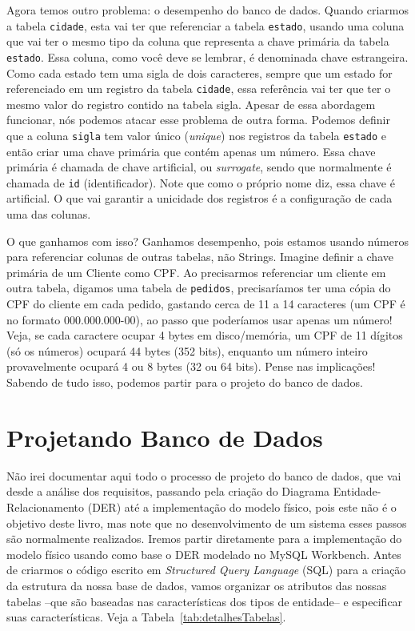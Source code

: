 Agora temos outro problema: o desempenho do banco de dados. Quando criarmos a tabela \texttt{cidade}, esta vai ter que referenciar a tabela \texttt{estado}, usando uma coluna que vai ter o mesmo tipo da coluna que representa a chave primária da tabela \texttt{estado}. Essa coluna, como você deve se lembrar, é denominada chave estrangeira. Como cada estado tem uma sigla de dois caracteres, sempre que um estado for referenciado em um registro da tabela \texttt{cidade}, essa referência vai ter que ter o mesmo valor do registro contido na tabela sigla. Apesar de essa abordagem funcionar, nós podemos atacar esse problema de outra forma. Podemos definir que a coluna \texttt{sigla} tem valor único (\textit{unique}) nos registros da tabela \texttt{estado} e então criar uma chave primária que contém apenas um número. Essa chave primária é chamada de chave artificial, ou \textit{surrogate}, sendo que normalmente é chamada de \texttt{id} (identificador). Note que como o próprio nome diz, essa chave é artificial. O que vai garantir a unicidade dos registros é a configuração de cada uma das colunas.

O que ganhamos com isso? Ganhamos desempenho, pois estamos usando números para referenciar colunas de outras tabelas, não Strings. Imagine definir a chave primária de um Cliente como CPF. Ao precisarmos referenciar um cliente em outra tabela, digamos uma tabela de \texttt{pedidos}, precisaríamos ter uma cópia do CPF do cliente em cada pedido, gastando cerca de 11 a 14 caracteres (um CPF é no formato 000.000.000-00), ao passo que poderíamos usar apenas um número! Veja, se cada caractere ocupar 4 bytes em disco/memória, um CPF de 11 dígitos (só os números) ocupará 44 bytes (352 bits), enquanto um número inteiro provavelmente ocupará 4 ou 8 bytes (32 ou 64 bits). Pense nas implicações! Sabendo de tudo isso, podemos partir para o projeto do banco de dados.


\section{Projetando Banco de Dados}

Não irei documentar aqui todo o processo de projeto do banco de dados, que vai desde a análise dos requisitos, passando pela criação do Diagrama Entidade-Relacionamento (DER) até a implementação do modelo físico, pois este não é o objetivo deste livro, mas note que no desenvolvimento de um sistema esses passos são normalmente realizados. Iremos partir diretamente para a implementação do modelo físico usando como base o DER modelado no MySQL Workbench. Antes de criarmos o código escrito em \textit{Structured Query Language} (SQL) para a criação da estrutura da nossa base de dados, vamos organizar os atributos das nossas tabelas –que são baseadas nas características dos tipos de entidade– e especificar suas características. Veja a Tabela~\ref{tab:detalhesTabelas}.

